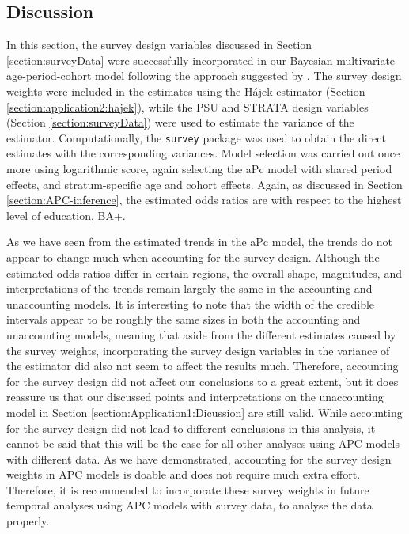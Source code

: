 \FloatBarrier
\subsection{Discussion}
\label{section:application2:discussion}
\vspace{-0.2cm}
In this section, the survey design variables discussed in Section \ref{section:surveyData} were successfully incorporated in our Bayesian multivariate age-period-cohort model following the approach suggested by \cite{SurveyDesignMercer}. The survey design weights were included in the estimates using the Hájek estimator (Section \ref{section:application2:hajek}), while the PSU and STRATA design variables (Section \ref{section:surveyData}) were used to estimate the variance of the estimator. Computationally, the \texttt{survey} package was used to obtain the direct estimates with the corresponding variances. Model selection was carried out once more using logarithmic score, again selecting the aPc model with shared period effects, and stratum-specific age and cohort effects. Again, as discussed in Section \ref{section:APC-inference}, the estimated odds ratios are with respect to the highest level of education, BA+. 

\vspace{-0.2cm}
As we have seen from the estimated trends in the aPc model, the trends do not appear to change much when accounting for the survey design. Although the estimated odds ratios differ in certain regions, the overall shape, magnitudes, and interpretations of the trends remain largely the same in the accounting and unaccounting models. It is interesting to note that the width of the credible intervals appear to be roughly the same sizes in both the accounting and unaccounting models, meaning that aside from the different estimates caused by the survey weights, incorporating the survey design variables in the variance of the estimator did also not seem to affect the results much. Therefore, accounting for the survey design did not affect our conclusions to a great extent, but it does reassure us that our discussed points and interpretations on the unaccounting model in Section \ref{section:Application1:Dicussion} are still valid. While accounting for the survey design did not lead to different conclusions in this analysis, it cannot be said that this will be the case for all other analyses using APC models with different data. As we have demonstrated, accounting for the survey design weights in APC models is doable and does not require much extra effort. Therefore, it is recommended to incorporate these survey weights in future temporal analyses using APC models with survey data, to analyse the data properly.

